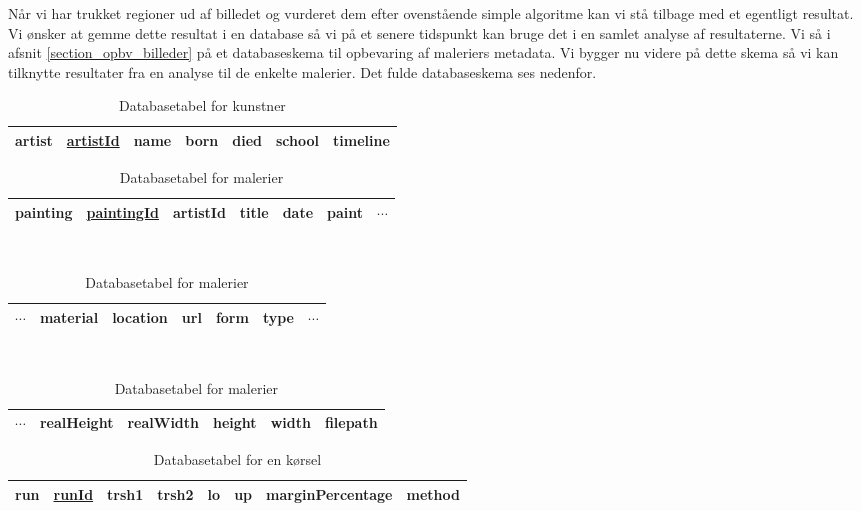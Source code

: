 {
Når vi har trukket regioner ud af billedet og vurderet dem efter
ovenstående simple algoritme kan vi stå tilbage med et egentligt
resultat. Vi ønsker at gemme dette resultat i en database så vi på et
senere tidspunkt kan bruge det i en samlet analyse af resultaterne.
Vi så i afsnit \ref{section_opbv_billeder} på et databaseskema til
opbevaring af maleriers metadata. Vi bygger nu videre på dette skema så
vi kan tilknytte resultater fra en analyse til de enkelte malerier. Det
fulde databaseskema ses nedenfor.

\begin{table}[!h]
    \centering
    \begin{tabular}{|l||c|c|c|c|c|c|}
        \hline
        \bf{artist} \hspace{0.5cm} & \underline{artistId} & name & born & died & school & timeline \\\hline
    \end{tabular}
    \caption{Databasetabel for kunstner}
    \label{artistTable}
\end{table}

\begin{table}[!h]
    \centering
    \begin{tabular}{|l||c|c|c|c|c|c}
        \hline
        \bf{painting} \hspace{0.5cm} & \underline{paintingId} & artistId & title & date & paint & $\cdots$ \\\hline
    \end{tabular}\\ \vspace{0.2cm}\hspace{1.2cm}
    \begin{tabular}{c|c|c|c|c|c|c}
        \hline
        $\cdots$ & material & location & url & form & type & $\cdots$ \\\hline
    \end{tabular}\\ \vspace{0.2cm}\hspace{1.4cm}
    \begin{tabular}{c|c|c|c|c|c|}
        \hline
        $\cdots$ & realHeight & realWidth & height & width & filepath \\\hline
    \end{tabular}
    \caption{Databasetabel for malerier}
    \label{paintingTable}
\end{table}

\begin{table}[!h]
    \centering
    \begin{tabular}{|l||c|c|c|c|c|c|c|}
        \hline
        \bf{run} \hspace{0.5cm} & \underline{runId} & trsh1 & trsh2 & lo & up & marginPercentage & method \\\hline
    \end{tabular}
    \caption{Databasetabel for en kørsel}
    \label{runTable}
\end{table}

}
